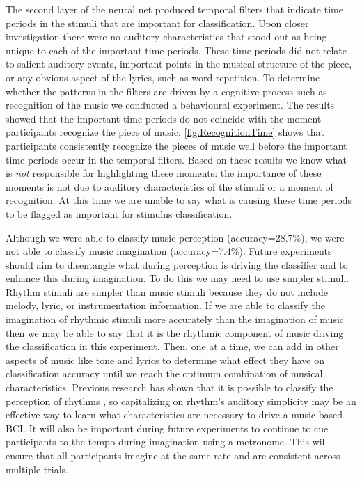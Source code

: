The second layer of the neural net produced temporal filters that indicate time periods in the stimuli that are important for classification. 
Upon closer investigation there were no auditory characteristics that stood out as being unique to each of the important time periods.
These time periods did not relate to salient auditory events, important points in the musical structure of the piece, or any obvious aspect of the lyrics, such as word repetition. 
To determine whether the patterns in the filters are driven by a cognitive process such as recognition of the music we conducted a behavioural experiment.
The results showed that the important time periods do not coincide with the moment participants recognize the piece of music. 
\autoref{fig:RecognitionTime} shows that participants consistently recognize the pieces of music well before the important time periods occur in the temporal filters. 
Based on these results we know what is \emph{not} responsible for highlighting these moments: the importance of these moments is not due to auditory characteristics of the stimuli or a moment of recognition.
At this time we are unable to say what is causing these time periods to be flagged as important for stimulus classification. 

Although we were able to classify music perception (accuracy=28.7\%), we were not able to classify music imagination (accuracy=7.4\%).
Future experiments should aim to disentangle what during perception is driving the classifier and to enhance this during imagination.
To do this we may need to use simpler stimuli.
Rhythm stimuli are simpler than music stimuli because they do not include melody, lyric, or instrumentation information. 
If we are able to classify the imagination of rhythmic stimuli more accurately than the imagination of music then we may be able to say that it is the rhythmic component of music driving the classification in this experiment.
Then, one at a time, we can add in other aspects of music like tone and lyrics to determine what effect they have on classification accuracy until we reach the optimum combination of musical characteristics.
Previous research has shown that it is possible to classify the perception of rhythms \cite{stober2014audiomostly}, so capitalizing on rhythm's auditory simplicity may be an effective way to learn what characteristics are necessary to drive a music-based \ac{BCI}.
It will also be important during future experiments to continue to cue participants to the tempo during imagination using a metronome.
This will ensure that all participants imagine at the same rate and are consistent across multiple trials.